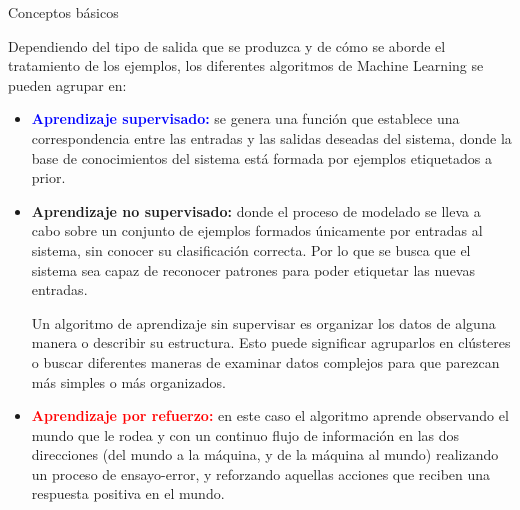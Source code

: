 \documentclass[11pt]{beamer}
\begin{document}
\begin{frame}{Conceptos b\'asicos}
\scriptsize{Dependiendo del tipo de salida que se produzca y de c\'omo se aborde el tratamiento de los ejemplos, los diferentes algoritmos de Machine Learning se pueden agrupar en:
\begin{itemize}
\item \textbf{\textcolor{blue}{Aprendizaje supervisado:}} se genera una funci\'on que establece una correspondencia entre las entradas y las salidas deseadas del sistema, donde la base de conocimientos del sistema est\'a formada por ejemplos etiquetados a prior.

\item \textbf{\textcolor{green!45!orange}{Aprendizaje no supervisado:}} donde el proceso de modelado se lleva a cabo sobre un conjunto de ejemplos formados \'unicamente por entradas al sistema, sin conocer su clasificaci\'on correcta. Por lo que se busca que el sistema sea capaz de reconocer patrones para poder etiquetar las nuevas entradas.

Un algoritmo de aprendizaje sin supervisar es organizar los datos de alguna manera o describir su estructura. Esto puede significar agruparlos en cl\'usteres o buscar diferentes maneras de examinar datos complejos para que parezcan m\'as simples o m\'as organizados.

\item \textbf{\textcolor{red}{Aprendizaje por refuerzo:}} en este caso el algoritmo aprende observando el mundo que le rodea y con un continuo flujo de informaci\'on en las dos direcciones (del mundo a la m\'aquina, y de la m\'aquina al mundo) realizando un proceso de ensayo-error, y reforzando aquellas acciones que reciben una respuesta positiva en el mundo.
		\end{itemize}
	}
	\end{frame}
	
\end{document}
